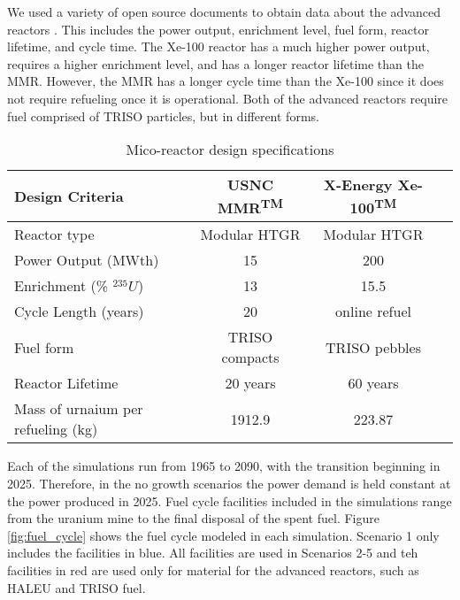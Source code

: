 We used a variety of open source documents to obtain data about the advanced reactors
\cite{harlan_x-energy_2018, hussain_advances_2018, mitchell_usnc_2020}. This includes 
the power output, enrichment level, fuel form, reactor lifetime, and cycle time. 
The Xe-100 reactor has a much higher power output, requires a higher enrichment 
level, and has a longer reactor lifetime than the \gls{MMR}. However, the 
\gls{MMR} has a longer cycle time than the Xe-100 since it does not require 
refueling once it is operational. Both of the advanced reactors require fuel 
comprised of \gls{TRISO} particles, but in different forms. 

\begin{table}[ht]
        \caption{Mico-reactor design specifications}
        \label{tab:reactor_summary}
        \begin{tabular}{l c c c}
            \hline
            Design Criteria & \gls{USNC} \gls{MMR}\textsuperscript{TM} & 
                X-Energy Xe-100\textsuperscript{TM} \\\hline
            Reactor type & Modular HTGR & Modular HTGR \\
            Power Output (MWth) & 15 & 200 \\
            Enrichment (\% $^{235}U$) & 13 & 15.5 \\
            Cycle Length (years) & 20 & online refuel\\
            Fuel form & \gls{TRISO} compacts & \gls{TRISO} pebbles\\
            Reactor Lifetime & 20 years & 60 years \\
            Mass of urnaium per refueling (kg) & 1912.9& 223.87 \\
            \hline
        \end{tabular}
    \end{table}

Each of the simulations run from 1965 to 2090, with the transition beginning 
in 2025. Therefore, in the no growth scenarios the power demand is held constant 
at the power produced in 2025. Fuel cycle facilities included in the simulations
range from the uranium mine to the final disposal of the spent fuel. Figure 
\ref{fig:fuel_cycle} shows the fuel cycle modeled in each simulation. Scenario 
1 only includes the facilities in blue. All facilities are used in Scenarios 
2-5 and teh facilities in red are used only for material for the advanced reactors, 
such as \gls{HALEU} and \gls{TRISO} fuel. 

